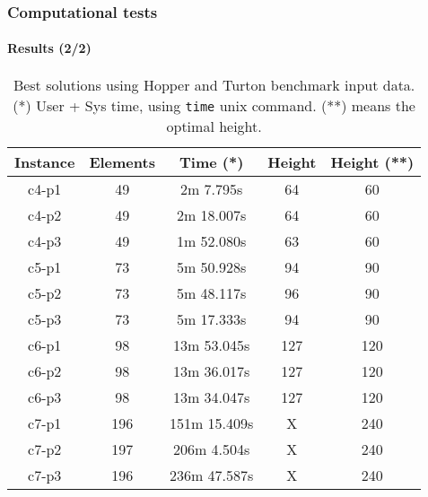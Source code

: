 \begin{frame}
    \frametitle{Computational tests}
    \framesubtitle{Results (2/2)}

    \begin{table}[H]
        \centering
        \small
        \begin{tabular}{|c|c|c|c|c|}
            \hline
            \textbf{Instance} & \textbf{Elements} & \textbf{Time (*)} & \textbf{Height} & \textbf{Height (**)} \\ \hline
            c4-p1             & 49                & 2m 7.795s     & 64              & 60                  \\ \hline
            c4-p2             & 49                & 2m 18.007s    & 64              & 60                  \\ \hline
            c4-p3             & 49                & 1m 52.080s    & 63              & 60                  \\ \hline
            c5-p1             & 73                & 5m 50.928s    & 94              & 90                  \\ \hline
            c5-p2             & 73                & 5m 48.117s    & 96              & 90                  \\ \hline
            c5-p3             & 73                & 5m 17.333s    & 94              & 90                  \\ \hline
            c6-p1             & 98                & 13m 53.045s   & 127             & 120                 \\ \hline
            c6-p2             & 98                & 13m 36.017s   & 127             & 120                 \\ \hline
            c6-p3             & 98                & 13m 34.047s   & 127             & 120                 \\ \hline
            c7-p1             & 196               & 151m 15.409s  & X             & 240                 \\ \hline
            c7-p2             & 197               & 206m 4.504s   & X             & 240                 \\ \hline
            c7-p3             & 196               & 236m 47.587s  & X             & 240                 \\ \hline
        \end{tabular}
        \label{tab:results}
        \caption{Best solutions using Hopper and Turton benchmark input 
    data. (*) User + Sys time, using \texttt{time} unix command. (**) means the optimal height.}
    \end{table}
\end{frame}


